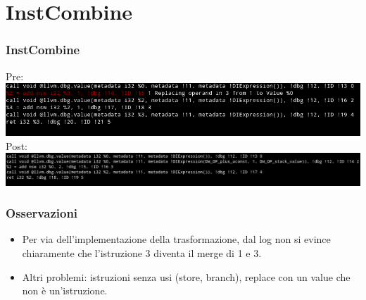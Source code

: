 \documentclass{beamer}
\begin{document}
\section{InstCombine}

\begin{frame}
\frametitle{InstCombine}
Pre: \newline
\includegraphics[scale=0.35]{pre_icomb.png}
\newline
Post: \newline
\includegraphics[scale=0.35]{post_icomb.png}
\end{frame}

\begin{frame}
\frametitle{Osservazioni}
\begin{itemize}
\item Per via dell'implementazione della trasformazione, dal log non si evince chiaramente che l'istruzione 3 diventa il merge di 1 e 3.
\item Altri problemi: istruzioni senza usi (store, branch), replace con un value che non è un'istruzione.
\end{itemize}

\end{frame}
\end{document}
